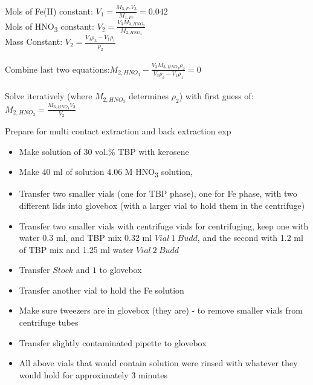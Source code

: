 \documentclass[idxtotoc,hyperref,openany,oneside]{labbook} %
\newcommand{\cmark}{\ding{51}}%
\newcommand{\done}{\rlap{$\square$}{\raisebox{2pt}{\large\hspace{1pt}\cmark}}%
  \hspace{-2.5pt}}
\newcommand{\tsbs}{\textsubscript}
\begin{document}
Mols of Fe(II) constant: $V_1=\frac{M_{3,Fe}V_3}{M_{1,Fe}}=0.042$\\
Mols of HNO\tsbs{3} constant: $V_2=\frac{V_3M_{3,HNO_3}}{M_{2,HNO_3}}$\\
Mass Constant: $V_2=\frac{V_3\rho_3-V_1\rho_1}{\rho_2}$\\~\\

Combine last two equations:$M_{2,HNO_3}-
\frac{V_3M_{3,HNO_3}\rho_2}{V_3\rho_3-V_1\rho_1}=0$\\~\\
Solve iteratively (where $M_{2,HNO_3}$ determines $\rho_2$)
with first guess of:
$M_{2,HNO_3}=\frac{M_{3,HNO_3}V_3}{V_2}$






\begin{todolist}
\item[\done]{Prepare for multi contact extraction and back extraction exp}
  \begin{itemize}
  \item{Make solution of 30 vol.\% TBP with kerosene}
  \item{Make 40 ml of solution 4.06 M HNO\tsbs{3} solution, }
  \item{Transfer two smaller vials (one for TBP phase), one for
    Fe phase, with two different lids into glovebox (with
  a larger vial to hold them in the centrifuge)}
  \item{Transfer two smaller vials with centrifuge vials for
    centrifuging, keep one with water 0.3 ml, and TBP mix 0.32 ml
    $\boxed{Vial\ 1\ Budd}$, and
    the second with 1.2 ml of TBP mix and 1.25 ml water
    $\boxed{Vial\ 2\ Budd}$}
  \item{Transfer $\boxed{Stock}$ and $\boxed{1}$ to glovebox}
  \item{Transfer another vial to hold the Fe solution}
  \item{Make sure tweezers are in glovebox (they are) - to remove smaller
    vials from centrifuge tubes}
  \item{Transfer slightly contaminated pipette to glovebox}
  \item{All above vials that would contain solution were rinsed
    with whatever they would hold for approximately 3 minutes}
  \end{itemize}
\end{todolist}
\end{document}
